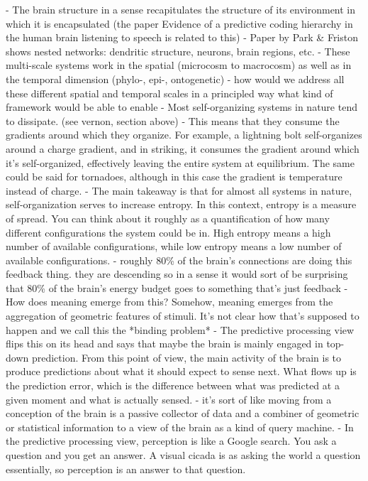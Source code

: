     - The brain structure in a sense recapitulates the structure of its environment in which it is encapsulated
    (the paper Evidence of a predictive coding hierarchy in the human brain listening to speech is related to this)
- Paper by Park \& Friston shows nested networks: dendritic structure, neurons, brain regions, etc. 
- These multi-scale systems work in the spatial (microcosm to macrocosm) as well as in the temporal dimension (phylo-, epi-, ontogenetic)
- how would we address all these different spatial and temporal scales in a principled way what kind of framework would be able to enable
- Most self-organizing systems in nature tend to dissipate. (see vernon, section above)
- This means that they consume the gradients around which they organize. For example, a lightning bolt self-organizes around a charge gradient, and in striking, it consumes the gradient around which it's self-organized, effectively leaving the entire system at equilibrium. The same could be said for tornadoes, although in this case the gradient is temperature instead of charge.
- The main takeaway is that for almost all systems in nature, self-organization serves to increase entropy. In this context, entropy is a measure of spread. You can think about it roughly as a quantification of how many different configurations the system could be in. High entropy means a high number of available configurations, while low entropy means a low number of available configurations.
- roughly 80\% of the brain's connections are doing this feedback thing. they are descending so in a sense it would sort of be surprising that 80\% of the brain's energy budget goes to something that's just feedback
- How does meaning emerge from this? Somehow, meaning emerges from the aggregation of geometric features of stimuli. It's not clear how that's supposed to happen and we call this the *binding problem*
- The predictive processing view flips this on its head and says that maybe the brain is mainly engaged in top-down prediction. From this point of view, the main activity of the brain is to produce predictions about what it should expect to sense next. What flows up is the prediction error, which is the difference between what was predicted at a given moment and what is actually sensed.
- it's sort of like moving from a conception of the brain is a passive collector of data and a combiner of geometric or statistical information to a view of the brain as a kind of query machine.
- In the predictive processing view, perception is like a Google search. You ask a question and you get an answer. A visual cicada is as asking the world a question essentially, so perception is an answer to that question.
